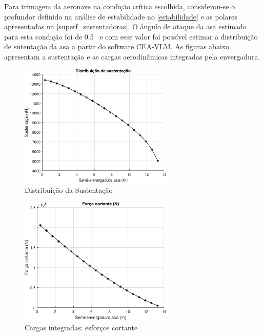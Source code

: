 Para trimagem da aeronave na condição crítica escolhida, considerou-se o profundor definido na análise de estabilidade no \autoref{estabilidade} e as polares apresentadas na \autoref{superf_sustentadoras}. O ângulo de ataque da asa estimado para esta condição foi de 0.5 \textdegree\ e com esse valor foi possível estimar a distribuição de sutentação da asa a partir do software CEA-VLM. As figuras abaixo apresentam a sustentação e as cargas aerodinâmicas integradas pela envergadura.

\begin{figure}[H]
\centering
\includegraphics[width=0.65\textwidth]{images/parte3/loads_lift.png}
\caption{Distribuição da Sustentação}
\label{fig:loads_lift}
\end{figure}

\clearpage

\begin{figure}[H]
\centering
\includegraphics[width=0.65\textwidth]{images/parte3/loads_shear.png}
\caption{Cargas integradas: esforços cortante}
\label{fig:loads_shear}
\end{figure}


